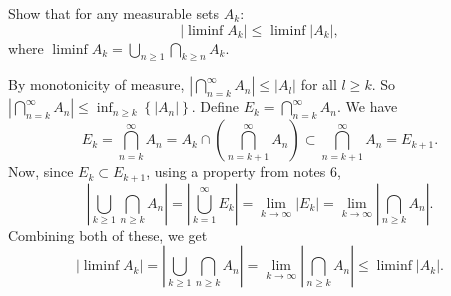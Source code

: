 \pagebreak


\begin{problem}{6}
  Show that for any measurable sets $A_k$:
  \[
  \left| \liminf A_k \right| \leq \liminf \left| A_k \right|,
  \]
  where $\liminf A_k = \bigcup_{n\geq 1} \bigcap_{k\geq n} A_k$.
\end{problem}

\begin{solution}
  By monotonicity of measure, $\left| \bigcap_{n=k}^{\infty} A_{n} \right| \leq \left| A_{l} \right|$ for all $l \geq k$.
  So $\left| \bigcap_{n=k}^{\infty} A_{n} \right| \leq \inf_{n \geq k} \left\{ \left| A_{n} \right| \right\}$.
  Define $E_{k} = \bigcap_{n = k}^{\infty} A_{n}$.
  We have
  \[
  E_{k} = \bigcap_{n = k}^{\infty} A_{n} = A_{k} \cap \left( \bigcap_{n = k + 1}^{\infty} A_{n} \right) \subset \bigcap_{n = k + 1}^{\infty} A_{n} = E_{k+1}
  .\] 
  Now, since $E_{k} \subset E_{k+1}$, using a property from notes 6,
  \[
  \left| \bigcup_{k\geq 1} \bigcap_{n\geq k} A_n \right| = \left| \bigcup_{k=1}^{\infty} E_{k}  \right| = \lim_{k \to \infty} \left| E_{k} \right| = \lim_{k \to \infty} \left| \bigcap_{n\geq k} A_n \right|
  .\] 
  Combining both of these, we get
  \[
  \left| \liminf A_k \right| = \left| \bigcup_{k\geq 1} \bigcap_{n\geq k} A_n \right| = \lim_{k \to \infty} \left| \bigcap_{n\geq k} A_n \right| \leq \liminf \left| A_k \right|
  .\] 

\end{solution}

